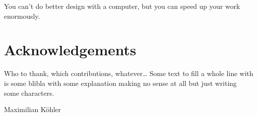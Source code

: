 
\thispagestyle{plain}
\begingroup
\begin{fquote}
    You can’t do better design with a computer, but you can speed up your work enormously.
\end{fquote}
\let\cleardoublepage\relax
\vspace{-1cm}

\chapter*{Acknowledgements}
\endgroup

Who to thank, which contributions, whatever\dots
Some text to fill a whole line with is some blibla with some explanation making no sense at all but just writing some characters.

\begin{flushright}
    Maximilian Köhler
\end{flushright}